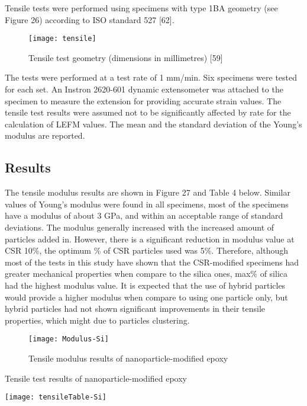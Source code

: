 \documentclass[numbers=noendperiod,chapterprefix=on]{icldt} %
\begin{document}
Tensile tests were performed using specimens with type 1BA geometry (see Figure 26) according to ISO standard 527 [62]. 

\begin{figure}[!htpb]
\centering
\texttt{[image: tensile]}
\caption{Tensile test geometry (dimensions in millimetres) [59]} %
\end{figure}

The tests were performed at a test rate of 1 mm/min. Six specimens were tested for each set. An Instron 2620-601 dynamic extensometer was attached to the specimen to measure the extension for providing accurate strain values. The tensile test results were assumed not to be significantly affected by rate for the calculation of LEFM values. The mean and the standard deviation of the Young’s modulus are reported.

\subsection{Results}
The tensile modulus results are shown in Figure 27 and Table 4 below. Similar values of Young’s modulus were found in all specimens, most of the specimens have a modulus of about 3 GPa, and within an acceptable range of standard deviations. The modulus generally increased with the increased amount of particles added in. However, there is a significant reduction in modulus value at CSR 10\%, the optimum \% of CSR particles used was 5\%. Therefore, although most of the tests in this study have shown that the CSR-modified specimens had greater mechanical properties when compare to the silica ones, max\% of silica had the highest modulus value. It is expected that the use of hybrid particles would provide a higher modulus when compare to using one particle only, but hybrid particles had not shown significant improvements in their tensile properties, which might due to particles clustering.

\begin{figure}[!htpb]
\centering
\texttt{[image: Modulus-Si]}
\caption{Tensile modulus results of nanoparticle-modified epoxy } %
\end{figure}

\begin{table}[!htpb]
\centering
\caption{Tensile test results of nanoparticle-modified epoxy} %
\texttt{[image: tensileTable-Si]}
\end{table}
\end{document}
